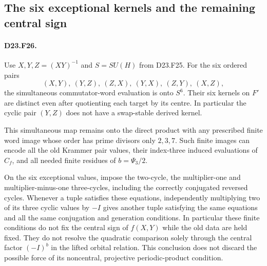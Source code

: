 \subsection{The six exceptional kernels and the remaining central sign}

\paragraph{D23.F26.}
Use $X,Y,Z=(XY)^{-1}$ and $S=SU(H)$ from D23.F25.  For the
six ordered pairs
\[
 (X,Y),\ (Y,Z),\ (Z,X),\ (Y,X),\ (Z,Y),\ (X,Z),
\tag{D23.F26.1}
\]
the simultaneous commutator-word evaluation is onto $S^6$.
Their six kernels on $F'$ are distinct even after quotienting
each target by its centre.  In particular the cyclic pair
$(Y,Z)$ does not have a swap-stable derived kernel.

This simultaneous map remains onto the direct product with
any prescribed finite word image whose order has prime divisors
only $2,3,7$.  Such finite images can encode all the old Krammer
pair values, their index-three induced evaluations of $C_f$,
and all needed finite residues of $b=\Psi_3/2$.

On the six exceptional values, impose the two-cycle, the
multiplier-one and multiplier-minus-one three-cycles, including
the correctly conjugated reversed cycles.  Whenever a tuple
satisfies these equations, independently multiplying two of
its three cyclic values by $-I$ gives another tuple satisfying
the same equations and all the same conjugation and generation
conditions.  In particular these finite conditions do not fix
the central sign of $f(X,Y)$ while the old data are held fixed.
They do not resolve the quadratic comparison solely through
the central factor $(-I)^b$ in the lifted orbital relation.
This conclusion does not discard the possible force of its
noncentral, projective periodic-product condition.

